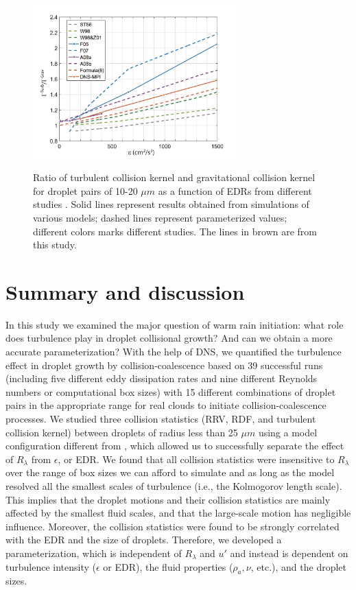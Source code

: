\begin{figure}[ht]
\centering
\includegraphics[width=0.7\textwidth]{Figures/Chap2/compares.jpg}  \\
\caption{Ratio of turbulent collision kernel and gravitational collision kernel for droplet pairs of 10-20 $\mu m$ as a function of EDRs from different studies \citep{Saffman1956, Wang1998b, Zhou2001, Ayala2008a, Ayala2008b, Franklin2005, Franklin2007}. Solid lines represent results obtained from simulations of various models; dashed lines represent parameterized values; different colors marks different studies. The lines in brown are from this study. }\label{fig:colker}
\end{figure}

\section{Summary and discussion} \label{sec:ch2_conclusion}

In this study we examined the major question of warm rain initiation: what role does turbulence play in droplet collisional growth? And can we obtain a more accurate parameterization? With the help of DNS, we quantified the turbulence effect in droplet growth by collision-coalescence based on 39 successful runs (including five different eddy dissipation rates and nine different Reynolds numbers or computational box sizes) with 15 different combinations of droplet pairs in the appropriate range for real clouds to initiate collision-coalescence processes. We studied three collision statistics (RRV, RDF, and turbulent collision kernel) between droplets of radius less than 25 $\mu m$ using a model configuration different from \citet{Franklin2005}, which allowed us to successfully separate the effect of $R_\lambda$ from $\epsilon$, or EDR. We found that all collision statistics were insensitive to $R_\lambda$ over the range of box sizes we can afford to simulate and as long as the model resolved all the smallest scales of turbulence (i.e., the Kolmogorov length scale). This implies that the droplet motions and their collision statistics are mainly affected by the smallest fluid scales, and that the large-scale motion has negligible influence. Moreover, the collision statistics were found to be strongly correlated with the EDR and the size of droplets. Therefore, we developed a parameterization, which is independent of $R_\lambda$ and $u\prime$ and instead is dependent on turbulence intensity ($\epsilon$ or EDR), the fluid properties ($\rho_a, \nu$, etc.), and the droplet sizes. 

